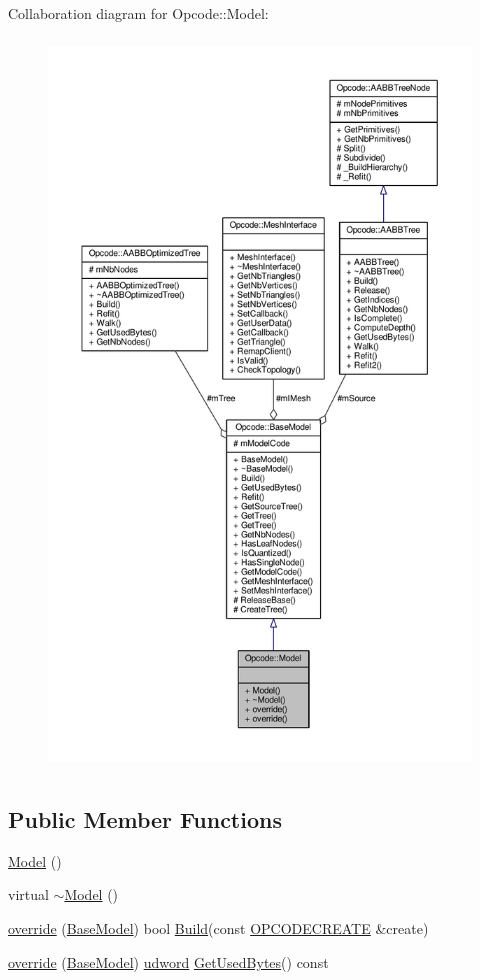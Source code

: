 Collaboration diagram for Opcode\+:\+:Model\+:
\nopagebreak
\begin{figure}[H]
\begin{center}
\leavevmode
\includegraphics[height=550pt]{df/d6a/classOpcode_1_1Model__coll__graph}
\end{center}
\end{figure}
\subsection*{Public Member Functions}
\begin{DoxyCompactItemize}
\item 
\hyperlink{classOpcode_1_1Model_ae3b375de5f6df4faf74a95d64748e048}{Model} ()
\item 
virtual \hyperlink{classOpcode_1_1Model_ad6ebd2062a0b823db841a0b88baac4c0}{$\sim$\+Model} ()
\item 
\hyperlink{classOpcode_1_1Model_a4d2d33a3f0b954b786adfef5d9af5b0e}{override} (\hyperlink{classOpcode_1_1BaseModel}{Base\+Model}) bool \hyperlink{classOpcode_1_1BaseModel_aa6d81288c9a60ffb1866d60ef2af3c2d}{Build}(const \hyperlink{structOpcode_1_1OPCODECREATE}{O\+P\+C\+O\+D\+E\+C\+R\+E\+A\+TE} \&create)
\item 
\hyperlink{classOpcode_1_1Model_a07a81ee0a06e5f3b64404673024ef5e3}{override} (\hyperlink{classOpcode_1_1BaseModel}{Base\+Model}) \hyperlink{IceTypes_8h_a44c6f1920ba5551225fb534f9d1a1733}{udword} \hyperlink{classOpcode_1_1BaseModel_a98e9f8effab91a773edb478347acdb54}{Get\+Used\+Bytes}() const 
\end{DoxyCompactItemize}
